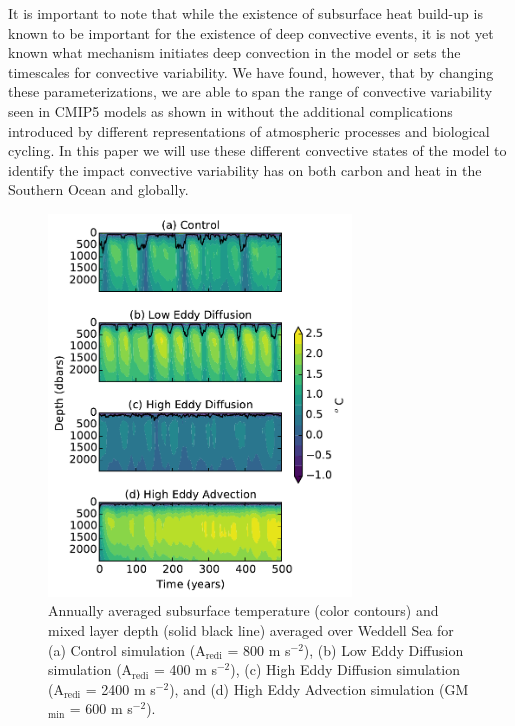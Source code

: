 It is important to note that while the existence of subsurface heat build-up is
known to be important for the existence of deep convective events, it is not yet
known what mechanism initiates deep convection in the model or sets the
timescales for convective variability. We have found, however, that by changing
these parameterizations, we are able to span the range of convective variability
seen in CMIP5 models as shown in \citet{DeLavergne2014a} without the
additional complications introduced by different representations of atmospheric
processes and biological cycling. In this paper we will use these different
convective states of the model to identify the impact convective variability has
on both carbon and heat in the Southern Ocean and globally.


\begin{figure}
\centering
\includegraphics[width=19pc]{figure3.pdf}
\caption{Annually averaged subsurface temperature (color contours) and mixed
layer depth (solid black line) averaged over Weddell Sea for (a) Control
simulation (A$_{\mathrm{redi}}$ = 800 m s$^{-2}$), (b) Low Eddy Diffusion simulation
(A$_{\mathrm{redi}}$ = 400 m s$^{-2}$), (c) High Eddy Diffusion simulation
(A$_{\mathrm{redi}}$ = 2400 m s$^{-2}$), and (d) High Eddy Advection simulation
(GM$_{\min}$ = 600 m s$^{-2}$).}
\label{fig:convection}
\end{figure}

